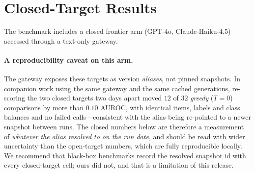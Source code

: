 \documentclass[11pt]{article}
\begin{document}
\section{Closed-Target Results}\label{app:closed}
The benchmark includes a closed frontier arm (GPT-4o, Claude-Haiku-4.5) accessed through a
text-only gateway.

\paragraph{A reproducibility caveat on this arm.} The gateway exposes these targets as version
\emph{aliases}, not pinned snapshots. In companion work using the same gateway and the same
cached generations, re-scoring the two closed targets two days apart moved $12$ of $32$
\emph{greedy} ($T{=}0$) comparisons by more than $0.10$ AUROC, with identical items, labels and
class balances and no failed calls---consistent with the alias being re-pointed to a newer
snapshot between runs. The closed numbers below are therefore a measurement of
\emph{whatever the alias resolved to on the run date}, and should be read with wider
uncertainty than the open-target numbers, which are fully reproducible locally. We recommend
that black-box benchmarks record the resolved snapshot id with every closed-target cell; ours
did not, and that is a limitation of this release.
\end{document}
